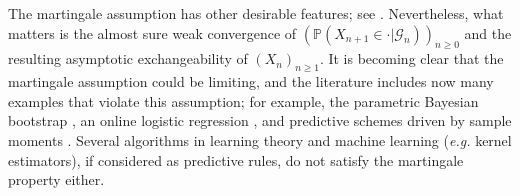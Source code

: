 \documentclass{article}
\theoremstyle{definition}
\renewcommand{\&}{and}
\begin{document}
The martingale assumption has other desirable features; see \cite{fong2021martingale}. %
Nevertheless, what matters is the almost sure weak convergence of $(\mathbb{P}(X_{n+1} \in \cdot |\mathcal{G}_n))_{n \geq 0}$ and the resulting asymptotic exchangeability of $(X_n)_{n\geq 1}$.  %
It is becoming clear that the martingale assumption could be limiting, and the literature includes now many examples that violate this assumption; for example, the parametric Bayesian bootstrap \citep{holmes2023statistical}, an online logistic regression \citep{fortini2024exchangeability}, and predictive schemes driven by sample moments \citep{garelli2024asymptotics}. Several algorithms in learning theory and machine learning (\textit{e.g.} kernel estimators), if considered as predictive rules, do not satisfy the martingale property either. %

\end{document}
